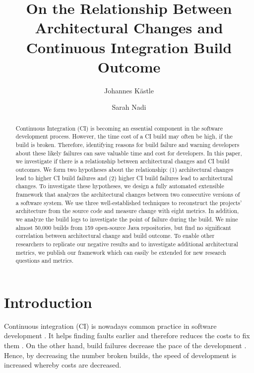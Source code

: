 \documentclass[sigplan, anonymous, review]{acmart}
\begin{document}
\title[Architectural Change vs CI Build Outcome]{On the Relationship Between Architectural Changes and Continuous Integration Build Outcome
}

\author{Johannes K{\"a}stle}

\author{Sarah Nadi}

\begin{abstract}
Continuous Integration (CI) is becoming an essential component in the software development process.
However, the time cost of a CI build may often be high, if the build is broken.
Therefore, identifying reasons for build failure and warning developers about these likely failures can save valuable time and cost for developers.
In this paper, we investigate if there is a relationship between architectural changes and CI build outcomes.
We form two hypotheses about the relationship: (1) architectural changes lead to higher CI build failures and (2) higher CI build failures lead to architectural changes.
To investigate these hypotheses, we design a fully automated extensible framework that analyzes the architectural changes between two consecutive versions of a software system.
We use three well-established techniques to reconstruct the projects' architecture from the source code and measure change with eight metrics. 
In addition, we analyze the build logs to investigate the point of failure during the build. 
We mine almost 50,000 builds from 159 open-source Java repositories, but find no significant correlation between architectural change and build outcome. 
To enable other researchers to replicate our negative results and to investigate additional architectural metrics, we publish our framework which can easily be extended for new research questions and metrics.
\end{abstract}

\maketitle

\section{Introduction}

Continuous integration (CI) is nowadays common practice in software development \cite{CI-Common}. It helps finding faults earlier and therefore reduces the costs to fix them \cite{NutzenCI}. On the other hand, build failures decrease the pace of the development \cite{Costs-BuildFailures}. Hence, by decreasing the number broken builds, the speed of development is increased whereby costs are decreased.
\end{document}
